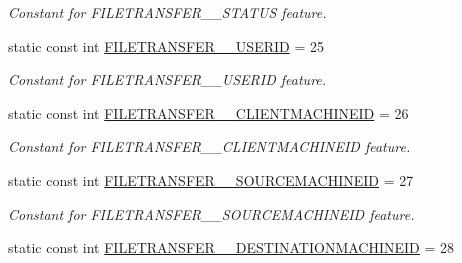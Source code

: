 \begin{DoxyCompactItemize}
\begin{DoxyCompactList}\small\item\em Constant for FILETRANSFER\_\-\_\-STATUS feature. \item\end{DoxyCompactList}\item 
\hypertarget{classFMS__Data_1_1FMS__DataPackage_aa85ca19604ad61814b330a8e35eb51bb}{
static const int \hyperlink{classFMS__Data_1_1FMS__DataPackage_aa85ca19604ad61814b330a8e35eb51bb}{FILETRANSFER\_\-\_\-USERID} = 25}
\label{classFMS__Data_1_1FMS__DataPackage_aa85ca19604ad61814b330a8e35eb51bb}

\begin{DoxyCompactList}\small\item\em Constant for FILETRANSFER\_\-\_\-USERID feature. \item\end{DoxyCompactList}\item 
\hypertarget{classFMS__Data_1_1FMS__DataPackage_a84d13a1538b5bfed82006000df011917}{
static const int \hyperlink{classFMS__Data_1_1FMS__DataPackage_a84d13a1538b5bfed82006000df011917}{FILETRANSFER\_\-\_\-CLIENTMACHINEID} = 26}
\label{classFMS__Data_1_1FMS__DataPackage_a84d13a1538b5bfed82006000df011917}

\begin{DoxyCompactList}\small\item\em Constant for FILETRANSFER\_\-\_\-CLIENTMACHINEID feature. \item\end{DoxyCompactList}\item 
\hypertarget{classFMS__Data_1_1FMS__DataPackage_ada6777be68f7c833450a5880a034a64a}{
static const int \hyperlink{classFMS__Data_1_1FMS__DataPackage_ada6777be68f7c833450a5880a034a64a}{FILETRANSFER\_\-\_\-SOURCEMACHINEID} = 27}
\label{classFMS__Data_1_1FMS__DataPackage_ada6777be68f7c833450a5880a034a64a}

\begin{DoxyCompactList}\small\item\em Constant for FILETRANSFER\_\-\_\-SOURCEMACHINEID feature. \item\end{DoxyCompactList}\item 
\hypertarget{classFMS__Data_1_1FMS__DataPackage_a18516685c58c88d25b1905d44ca56ed8}{
static const int \hyperlink{classFMS__Data_1_1FMS__DataPackage_a18516685c58c88d25b1905d44ca56ed8}{FILETRANSFER\_\-\_\-DESTINATIONMACHINEID} = 28}
\label{classFMS__Data_1_1FMS__DataPackage_a18516685c58c88d25b1905d44ca56ed8}


\end{DoxyCompactItemize}

